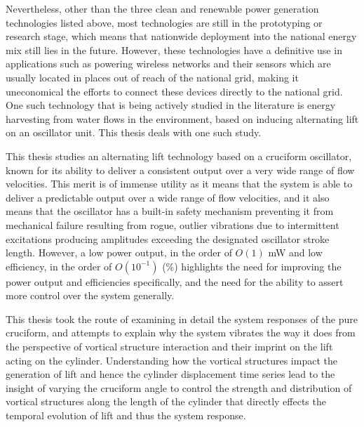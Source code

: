\documentclass[oneside]{utmthesis}
\begin{document}
Nevertheless, other than the three clean and renewable power generation technologies listed above, most technologies are still in the prototyping or research stage, which means that nationwide deployment into the national energy mix still lies in the future. However, these technologies have a definitive use in applications such as powering wireless networks and their sensors which are usually located in places out of reach of the national grid, making it uneconomical the efforts to connect these devices directly to the national grid. One such technology that is being actively studied in the literature is energy harvesting from water flows in the environment, based on inducing alternating lift on an oscillator unit. This thesis deals with one such study.

This thesis studies an alternating lift technology based on a cruciform oscillator, known for its ability to deliver a consistent output over a very wide range of flow velocities. This merit is of immense utility as it means that the system is able to deliver a predictable output over a wide range of flow velocities, and it also means that the oscillator has a built-in safety mechanism preventing it from mechanical failure resulting from rogue, outlier vibrations due to intermittent excitations producing amplitudes exceeding the designated oscillator stroke length. However, a low power output, in the order of $O(1)$ mW and low efficiency, in the order of $O(10^{-1})$ (\%) highlights the need for improving the power output and efficiencies specifically, and the need for the ability to assert more control over the system generally.

This thesis took the route of examining in detail the system responses of the pure cruciform, and attempts to explain why the system vibrates the way it does from the perspective of vortical structure interaction and their imprint on the lift acting on the cylinder. Understanding how the vortical structures impact the generation of lift and hence the cylinder displacement time series lead to the insight of varying the cruciform angle to control the strength and distribution of vortical structures along the length of the cylinder that directly effects the temporal evolution of lift and thus the system response.
\end{document}

